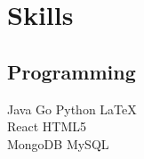 \documentclass[]{resume_en}
\begin{document}
\begin{minipage}[t]{0.33\textwidth}

\section{Skills}
\subsection{Programming}
Java \textbullet{} Go \textbullet{} Python \textbullet{} \LaTeX\ \\
React \textbullet{} HTML5\\
MongoDB \textbullet{} MySQL
\sectionsep

%
%

\end{minipage} 
\hfill
\end{document}
